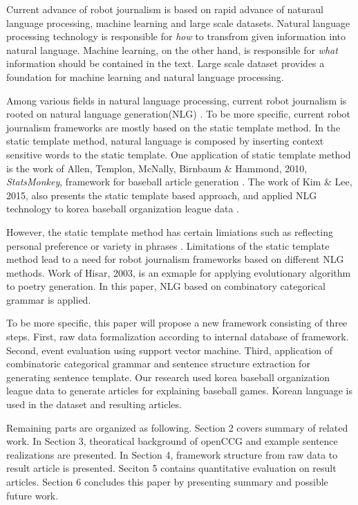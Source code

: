 \documentclass{sig-alternate}
\begin{document}
Current advance of robot journalism is based on rapid advance of naturaul language processing, machine learning and large scale datasets. Natural language processing technology is responsible for \textit{how} to transfrom given information into natural language. Machine learning, on the other hand, is responsible for \textit{what} information should be contained in the text. Large scale dataset provides a foundation for machine learning and natural language processing.

Among various fields in natural language processing, current robot journalism is rooted on natural language generation(NLG) \cite{Konst2015}. To be more specific, current robot journalism frameworks are mostly based on the static template method. In the static template method, natural language is composed by inserting context sensitive words to the static template. One application of static template method is the work of Allen, Templon, McNally, Birnbaum \& Hammond, 2010, \textit{StatsMonkey}, framework for baseball article generation  \cite{Nicholas2010}. The work of Kim \& Lee, 2015, also presents the static template based approach, and applied NLG technology to korea baseball organization league data  \cite{Donghwan2015}. 

However, the static template method has certain limiations such as reflecting personal preference or variety in phrases \cite{Donghwan2015}. Limitations of the static template method lead to a need for robot journalism frameworks based on different NLG methods. Work of Hisar, 2003, is an exmaple for applying evolutionary algorithm to poetry generation. In this paper, NLG based on combinatory categorical grammar is applied. 

To be more specific, this paper will propose a new framework consisting of three steps. First, raw data formalization according to internal database of framework. Second, event evaluation using support vector machine. Third, application of combinatoric categorical grammar and sentence structure extraction for generating sentence template. Our research used korea baseball organization league data to generate articles for explaining baseball games. Korean language is used in the dataset and resulting articles. 

Remaining parts are organized as following. Section 2 covers summary of related work. In Section 3, theoratical background of openCCG and example sentence realizations are presented. In Section 4, framework structure from raw data to result article is presented. Seciton 5 contains quantitative evaluation on result articles. Section 6 concludes this paper by presenting summary and possible future work.  
\end{document}

